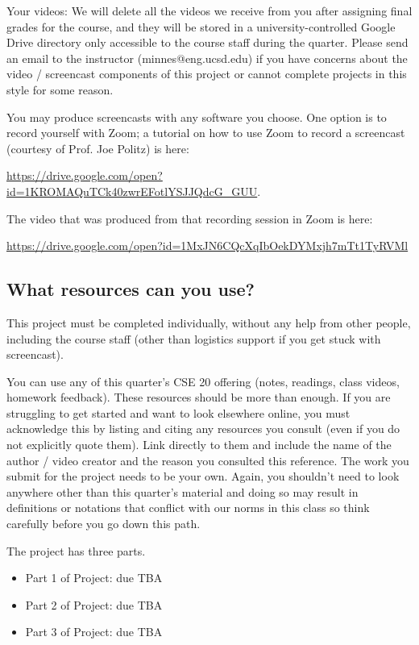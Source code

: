 Your videos: We will delete all the videos we receive from you after assigning final grades for the course, 
and they will be stored in a university-controlled Google Drive directory 
only accessible to the course staff during the quarter. 
Please send an email to the instructor (minnes@eng.ucsd.edu) if you have 
concerns about 
the video / screencast components of this project or cannot complete projects in this style for some reason.

You may produce screencasts with any software you choose. 
One option is to record yourself with Zoom; a tutorial on how to use Zoom to record a 
screencast (courtesy of Prof. Joe Politz)  is here: 

\url{https://drive.google.com/open?id=1KROMAQuTCk40zwrEFotlYSJJQdcG_GUU}.

The video that was produced from that recording session in Zoom is here:

\url{https://drive.google.com/open?id=1MxJN6CQcXqIbOekDYMxjh7mTt1TyRVMl}

\subsection*{What resources can you use?}
This project must be completed individually, without any help from other people, 
including the course staff (other than logistics support if you get stuck with screencast). 

You can use any of this quarter's CSE 20 offering (notes, readings, class videos, homework feedback). 
These resources should be more than enough. If you are struggling to get started and want to 
look elsewhere online, you must acknowledge this by listing and citing any resources you consult 
(even if you do not explicitly quote them). Link directly to them and include the name of the 
author / video creator and the reason you consulted this reference. The work you submit for 
the project needs to be your own. Again, you shouldn't need to look anywhere other 
than this quarter's material and doing so may result in definitions or notations 
that conflict with our norms in this class so think carefully before you go down this path.

The project has three parts. 
\begin{itemize}
    \item Part 1 of Project: due TBA
    \item Part 2 of Project: due TBA
    \item Part 3 of Project: due TBA
\end{itemize}

